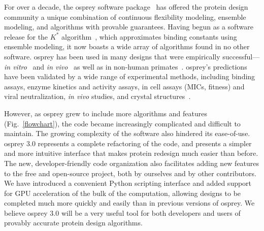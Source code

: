 For over a decade, the {\sc osprey} software package~\cite{OSPREY,minDEE,OSPREY_MIE} has offered the protein design community a unique combination of continuous flexibility modeling, ensemble modeling, and algorithms with provable guarantees.  Having begun as a software release for the $K^*$ algorithm~\cite{minDEE,GrsA-LeuA}, which approximates binding constants using ensemble modeling, it now boasts a wide array of algorithms found in no other software.  {\sc osprey} has been used in many designs that were empirically successful---\textit{in vitro}~\cite{VRC07_enhance,CFTR,runx1_cbfb,GrsA-LeuA,DHFR-PNAS,GrsA-TyrA,specific_probes} and \textit{in vivo}~\cite{VRC07_enhance,CFTR,runx1_cbfb,DHFR-PNAS} as well as in non-human primates~\cite{VRC07_enhance}.  {\sc osprey}'s predictions have been validated by a wide range of experimental methods, including binding assays, enzyme kinetics and activity assays, in cell assays (MICs, fitness) and viral neutralization, {\em in vivo} studies, and crystal structures~\cite{DHFR-PNAS2, VRC07_enhance}.    

However, as {\sc osprey} grew to include more algorithms and features (Fig.~\ref{flowchart}), the code became increasingly complicated and difficult to maintain.  The growing complexity of the software also hindered its ease-of-use. {\sc osprey} 3.0 represents a complete refactoring of the code, and presents a simpler and more intuitive interface that makes protein redesign much easier than before. The new, developer-friendly code organization also facilitates adding new features to the free and open-source \osprey project, both by ourselves and by other contributors.  We have introduced a convenient Python scripting interface and added support for GPU acceleration of the bulk of the computation, allowing designs to be completed much more quickly and easily than in previous versions of {\sc osprey}.  We believe {\sc osprey} 3.0 will be a very useful tool for both developers and users of provably accurate protein design algorithms.  


